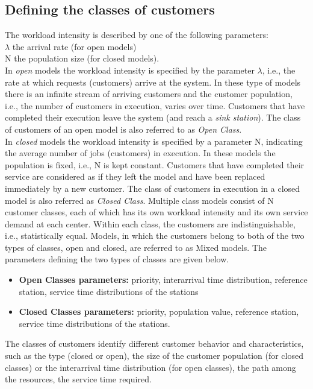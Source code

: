 \subsection{Defining the classes of customers} \label{sec:DefineClasses}
 The workload intensity is described by one of the following
 parameters:\\
$\lambda$ the arrival rate (for open models)\\
N the population size (for closed models).\\
In \emph{open} models the workload intensity is specified by the
parameter $\lambda$, i.e., the rate at which requests (customers)
arrive at the system. In these type of models there is an infinite
stream of arriving customers and the customer population, i.e.,
the number of customers in execution, varies over time. Customers
that have completed their execution leave the system (and reach a
\emph{sink station}). The class of customers of an open model is
also referred to as \emph{Open Class}.\\
 In \emph{closed} models the workload intensity is specified by a
parameter N, indicating the average number of jobs (customers) in
execution. In these models the population is fixed, i.e., N is
kept constant. Customers that have completed their service are
considered as if they left the model and have been replaced
immediately by a new customer. The class of customers in execution
in a closed model is also referred as \emph{Closed Class}.
 Multiple class models consist of N customer classes, each of which
 has its own workload intensity and its own service demand at each center.
 Within each class, the customers are indistinguishable, i.e., statistically
 equal. Models, in which the customers belong to both of the two types of
 classes, open and closed, are referred to as Mixed models.
The parameters defining the two types of classes are given below.
\begin{itemize}
\item \textbf{Open Classes parameters:} priority, interarrival
time distribution, reference station, service time distributions
of the stations \item \textbf{Closed Classes parameters:}
priority, population value, reference station, service time
distributions of the stations. \end{itemize}

 The classes
of customers identify different customer behavior and
characteristics, such as the type (closed or open), the size of
the customer population (for closed classes) or the interarrival
time distribution (for open classes), the path among the
resources, the service time required.


